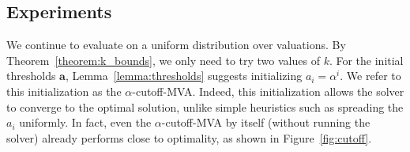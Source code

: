 



\subsection{Experiments}

We continue to evaluate on a uniform distribution over valuations.
By Theorem~\ref{theorem:k_bounds}, we only need to try two values of $k$.
For the initial thresholds $\boldsymbol a$, Lemma~\ref{lemma:thresholds}
suggests initializing $a_i = \alpha^i$.  We refer to this initialization as
the $\alpha$-cutoff-MVA.  Indeed, this initialization allows the solver to
converge to the optimal solution, unlike simple heuristics such as
spreading the $a_i$ uniformly.  In fact, even the $\alpha$-cutoff-MVA by
itself (without running the solver) already performs close to optimality,
as shown in Figure~\ref{fig:cutoff}.



